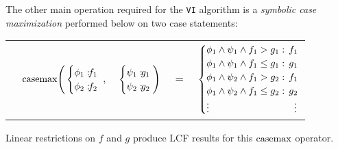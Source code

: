 The other main operation required for the \texttt{VI} algorithm is a \emph{symbolic case maximization} performed below on two case statements:
\vspace{-4mm}
{\footnotesize
\begin{center}
\begin{tabular}{r c c c l}
&
\hspace{-7mm} $\casemax \Bigg(
  \begin{cases}
    \phi_1: \hspace{-2mm} & \hspace{-2mm} f_1 \\ 
    \phi_2: \hspace{-2mm} & \hspace{-2mm} f_2 \\ 
  \end{cases}$
$,$
&
\hspace{-4mm}
  $\begin{cases}
    \psi_1: \hspace{-2mm} & \hspace{-2mm} g_1 \\ 
    \psi_2: \hspace{-2mm} & \hspace{-2mm} g_2 \\ 
  \end{cases} \Bigg)$
&
\hspace{-4mm} 
$ = $
&
\hspace{-4mm}
  $\begin{cases}
  \phi_1 \wedge \psi_1 \wedge f_1 > g_1    : & \hspace{-2mm} f_1 \\ 
  \phi_1 \wedge \psi_1 \wedge f_1 \leq g_1 : & \hspace{-2mm} g_1 \\ 
  \phi_1 \wedge \psi_2 \wedge f_1 > g_2    : & \hspace{-2mm}f_1 \\ 
  \phi_1 \wedge \psi_2 \wedge f_1 \leq g_2 : & \hspace{-2mm} g_2 \\ 
 \vdots & \vdots
  \end{cases}$
\end{tabular}
\end{center}
} Linear restrictions on $f$ and $g$ produce LCF results for this $\mathrm{casemax}$ operator.
